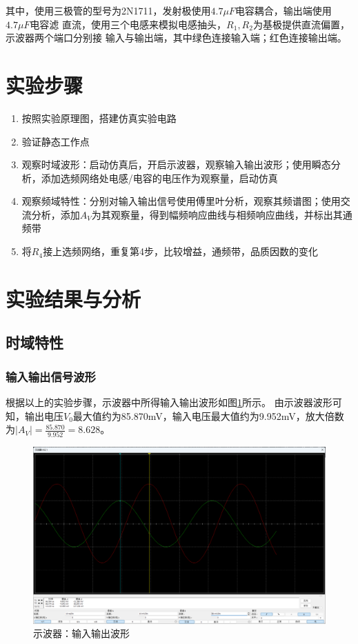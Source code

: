 \documentclass[UTF8]{ctexart}
\begin{document}
其中，使用三极管的型号为2N1711，发射极使用$4.7\mu F$电容耦合，输出端使用$4.7\mu F$电容滤
直流，使用三个电感来模拟电感抽头，$R_1,R_2$为基极提供直流偏置，示波器两个端口分别接
输入与输出端，其中绿色连接输入端；红色连接输出端。
\section{实验步骤}
\begin{enumerate}
    \item 按照实验原理图，搭建仿真实验电路
    \item 验证静态工作点
    \item 观察时域波形：启动仿真后，开启示波器，观察输入输出波形；使用瞬态分析，添加选频网络处电感/电容的电压作为观察量，启动仿真
    \item 观察频域特性：分别对输入输出信号使用傅里叶分析，观察其频谱图；使用交流分析，添加$A_V$为其观察量，得到幅频响应曲线与相频响应曲线，并标出其通频带
    \item 将$R_4$接上选频网络，重复第4步，比较增益，通频带，品质因数的变化
\end{enumerate}
\section{实验结果与分析}
\subsection{时域特性}
\subsubsection{输入输出信号波形}
根据以上的实验步骤，示波器中所得输入输出波形如图\ref{img:multisim_time_signal_graph}所示。
由示波器波形可知，输出电压$V_0$最大值约为85.870mV，输入电压最大值约为9.952mV，放大倍数为$|A_V|=\frac{85.870}{9.952}=8.628$。
\begin{figure}[htbp]
    \centering
    \includegraphics[width=0.8\linewidth]{multisim_time_signal_graph.png}
    \caption{示波器：输入输出波形}
    \label{img:multisim_time_signal_graph}
\end{figure}
\end{document}
